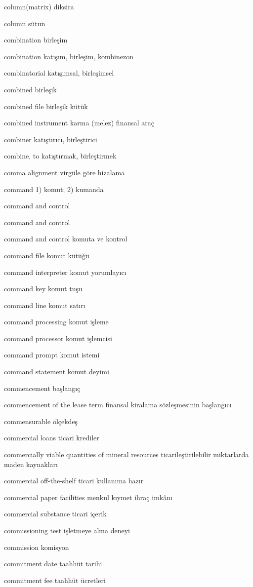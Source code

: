 \documentclass[12pt,fleqn]{article}\usepackage{../../common}
\begin{document}
column(matrix) diksira

column sütun

combination birleşim

combination katışım, birleşim, kombinezon

combinatorial katışımsal, birleşimsel

combined birleşik

combined file birleşik kütük

combined instrument karma (melez) finansal araç

combiner katıştırıcı, birleştirici

combine, to katıştırmak, birleştirmek

comma alignment virgüle göre hizalama

command 1) komut; 2) kumanda

command and control

command and control

command and control komuta ve kontrol

command file komut kütüğü

command interpreter komut yorumlayıcı

command key komut tuşu

command line komut satırı

command processing komut işleme

command processor komut işlemcisi

command prompt komut istemi

command statement komut deyimi

commencement başlangıç

commencement of the lease term finansal kiralama sözleşmesinin başlangıcı

commensurable ölçekdeş

commercial loans ticari krediler

commercially viable quantities of mineral resources ticarileştirilebilir miktarlarda maden kaynakları

commercial off-the-shelf ticari kullanıma hazır

commercial paper facilities menkul kıymet ihraç imkânı

commercial substance ticari içerik

commissioning test işletmeye alma deneyi

commission komisyon

commitment date taahhüt tarihi

commitment fee taahhüt ücretleri
\end{document}
